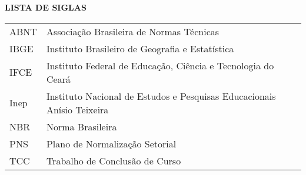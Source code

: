 \begin{center}
\textbf{LISTA DE SIGLAS}
\end{center}
\vspace*{0.5cm}
\begin{tabular}{ll}
ABNT & Associação Brasileira de Normas Técnicas \\
IBGE & Instituto Brasileiro de Geografia e Estatística \\
IFCE & Instituto Federal de Educação, Ciência e Tecnologia do Ceará \\
Inep & Instituto Nacional de Estudos e Pesquisas Educacionais Anísio Teixeira \\
NBR & Norma Brasileira \\
PNS & Plano de Normalização Setorial \\
TCC & Trabalho de Conclusão de Curso \\
\end{tabular}
\addtocounter{table}{0}